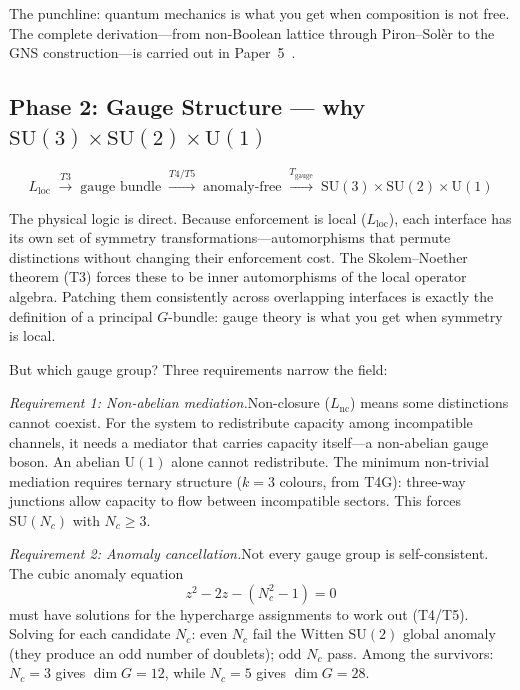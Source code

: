 \documentclass[11pt]{article}
\newcommand{\SU}{\mathrm{SU}}
\newcommand{\U}{\mathrm{U}}
\begin{document}
The punchline: quantum mechanics is what you get when composition is not free.  The complete derivation---from non-Boolean lattice through Piron--Sol\`er to the GNS construction---is carried out in Paper~5~\cite{P5}.


\subsection{Phase 2: Gauge Structure --- why \texorpdfstring{$\SU(3)\times\SU(2)\times\U(1)$}{SU(3)×SU(2)×U(1)}}

\begin{equation}
L_{\mathrm{loc}} \;\xrightarrow{T3}\; \text{gauge bundle} \;\xrightarrow{T4/T5}\; \text{anomaly-free} \;\xrightarrow{T_{\mathrm{gauge}}}\; \SU(3)\times\SU(2)\times\U(1)
\end{equation}

The physical logic is direct.  Because enforcement is local ($L_{\mathrm{loc}}$), each interface has its own set of symmetry transformations---automorphisms that permute distinctions without changing their enforcement cost.  The Skolem--Noether theorem (T3) forces these to be inner automorphisms of the local operator algebra.  Patching them consistently across overlapping interfaces is exactly the definition of a principal $G$-bundle: gauge theory is what you get when symmetry is local.

But which gauge group?  Three requirements narrow the field:

\textit{Requirement 1: Non-abelian mediation.}\quad Non-closure ($L_{\mathrm{nc}}$) means some distinctions cannot coexist.  For the system to redistribute capacity among incompatible channels, it needs a mediator that carries capacity itself---a non-abelian gauge boson.  An abelian $\U(1)$ alone cannot redistribute.  The minimum non-trivial mediation requires ternary structure ($k=3$ colours, from T4G): three-way junctions allow capacity to flow between incompatible sectors.  This forces $\SU(N_c)$ with $N_c \ge 3$.

\textit{Requirement 2: Anomaly cancellation.}\quad Not every gauge group is self-consistent.  The cubic anomaly equation
\begin{equation}
z^2 - 2z - (N_c^2 - 1) = 0
\end{equation}
must have solutions for the hypercharge assignments to work out (T4/T5).  Solving for each candidate $N_c$: even $N_c$ fail the Witten $\SU(2)$ global anomaly (they produce an odd number of doublets); odd $N_c$ pass.  Among the survivors: $N_c = 3$ gives $\dim G = 12$, while $N_c = 5$ gives $\dim G = 28$.
\end{document}
